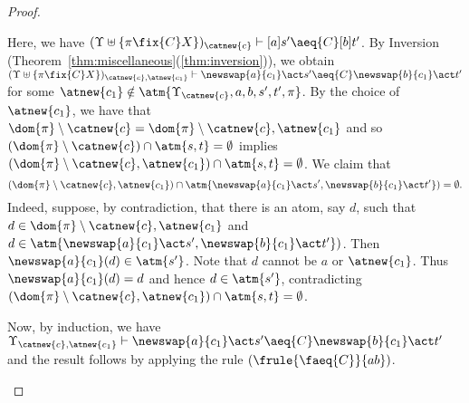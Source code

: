 \begin{proof}
\begin{enumerate}
\begin{itemize}
\begin{itemize}
                    Here, we have $(\Upsilon\uplus\{\pi\fix{C} X\})_{\catnew{c}} \vdash [a]s' \aeq{C} [b]t'$. By Inversion (Theorem~\ref{thm:miscellaneous}(\ref{thm:inversion})), we obtain $(\Upsilon\uplus\{\pi\fix{C} X\})_{\catnew{c},\atnew{c_1}} \vdash \newswap{a}{c_1} \act s' \aeq{C} \newswap{b}{c_1} \act t'$ for some $\atnew{c_1}\notin \atm{\Upsilon_{\catnew{c}},a,b,s',t',\pi}$.  By the choice of $\atnew{c_1}$, we have that $\dom{\pi}\setminus\catnew{c} = \dom{\pi}\setminus\catnew{c},\atnew{c_1}$ and so $(\dom{\pi}\setminus\catnew{c})\cap\atm{s,t} = \emptyset$ implies $(\dom{\pi}\setminus\catnew{c},\atnew{c_1})\cap\atm{s,t} = \emptyset$. We claim that
                    \[
                        (\dom{\pi}\setminus\catnew{c},\atnew{c_1})\cap\atm{\newswap{a}{c_1}\act s',\newswap{b}{c_1}\act t'}) = \emptyset.
                    \]
                    Indeed, suppose, by contradiction, that there is an atom, say $d$, such that $d\in \dom{\pi}\setminus\catnew{c},\atnew{c_1}$ and $d\in \atm{\newswap{a}{c_1}\act s',\newswap{b}{c_1}\act t'})$. Then $\newswap{a}{c_1}(d)\in \atm{s'}$. Note that $d$ cannot be $a$ or $\atnew{c_1}$. Thus $\newswap{a}{c_1}(d) = d$ and hence $d\in \atm{s'}$, contradicting $(\dom{\pi}\setminus\catnew{c},\atnew{c_1})\cap\atm{s,t} = \emptyset$. 

                    Now, by induction, we have $\Upsilon_{\catnew{c},\atnew{c_1}} \vdash \newswap{a}{c_1} \act s' \aeq{C} \newswap{b}{c_1} \act t'$ and the result follows by applying the rule $(\frule{\faeq{C}}{ab})$. 
            \end{itemize}
        \end{itemize}
\end{enumerate}

\end{proof}

